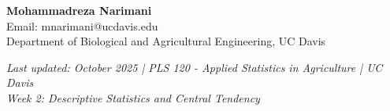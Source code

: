 \documentclass[11pt,a4paper]{article}
\begin{document}
\begin{infobox}
\textbf{Mohammadreza Narimani}\\
Email: mnarimani@ucdavis.edu\\
Department of Biological and Agricultural Engineering, UC Davis
\end{infobox}

\vfill

\begin{center}
\textit{Last updated: October 2025 | PLS 120 - Applied Statistics in Agriculture | UC Davis}\\
\textit{Week 2: Descriptive Statistics and Central Tendency}
\end{center}
\end{document}
